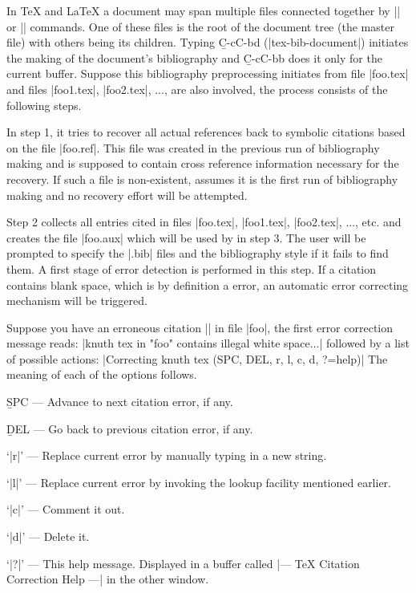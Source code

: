 {\begin{env}
\begin{minipage}
\noindent
In {\TeX} and {\LaTeX} a document may span multiple files
connected together by || or || commands.
One of these files is the root of the document tree (the master file)
with others being its children.
Typing {\b C-c{\s}C-b{\s}d} (|tex-bib-document|)
initiates the making of the document's bibliography
and {\b C-c{\s}C-b{\s}b} does it only for the current buffer.
Suppose this bibliography preprocessing initiates from file |foo.tex|
and files |foo1.tex|, |foo2.tex|, ..., are also involved,
the process consists of the following steps.

In step 1, it tries to recover all actual references back to
symbolic citations based on the file |foo.ref|.  This file was
created in the previous run of bibliography making and is supposed to
contain cross reference information necessary for the recovery.
If such a file is non-existent, {\TM} assumes it is the first run
of bibliography making and no recovery effort will be attempted.

Step 2 collects all entries cited in files |foo.tex|, |foo1.tex|, |foo2.tex|,
..., etc. and creates the file |foo.aux| which will be
used by {\BibTeX} in step 3.  The user will be prompted to specify
the |.bib| files and the bibliography style if it fails to find them.
A first stage of error detection is performed in this step.
If a citation contains blank space, which is by definition
a {\BibTeX} error, an automatic error correcting
mechanism will be triggered.

Suppose you have an erroneous citation |\cite{knuth tex}| in file |foo|, the
first error correction message reads:
\begindisplay
|{knuth tex} in "foo" contains illegal white space...|\cr
\enddisplay
followed by a list of possible actions:
\begindisplay
|Correcting {knuth tex} (SPC, DEL, r, l, c, d, ?=help)|\cr
\enddisplay
The meaning of each of the options follows.
\item{\bull}{{\b SPC} --- Advance to next citation error, if any.}
\item{\bull}{{\b DEL} --- Go back to previous citation error, if any.}
\item{\bull}{`|r|' --- Replace current error by manually typing in a new
string.}
\item{\bull}{`|l|' --- Replace current error by invoking the lookup facility
mentioned earlier.}
\item{\bull}{`|c|' --- Comment it out.}
\item{\bull}{`|d|' --- Delete it.}
\item{\bull}{`|?|' --- This help message. Displayed in a buffer called
|--- TeX Citation Correction Help ---| in the other window.}


\end{minipage}
\end{env}}

